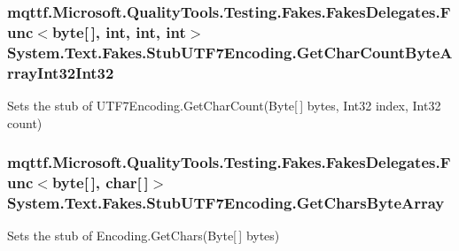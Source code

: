 \hypertarget{class_system_1_1_text_1_1_fakes_1_1_stub_u_t_f7_encoding_a3cb8eb1cb6572e14e0da37693b2c80de}{
\subsubsection[{Get\-Char\-Count\-Byte\-Array\-Int32\-Int32}]{\setlength{\rightskip}{0pt plus 5cm}mqttf.\-Microsoft.\-Quality\-Tools.\-Testing.\-Fakes.\-Fakes\-Delegates.\-Func$<$byte\mbox{[}$\,$\mbox{]}, int, int, int$>$ System.\-Text.\-Fakes.\-Stub\-U\-T\-F7\-Encoding.\-Get\-Char\-Count\-Byte\-Array\-Int32\-Int32}}\label{class_system_1_1_text_1_1_fakes_1_1_stub_u_t_f7_encoding_a3cb8eb1cb6572e14e0da37693b2c80de}


Sets the stub of U\-T\-F7\-Encoding.\-Get\-Char\-Count(\-Byte\mbox{[}$\,$\mbox{]} bytes, Int32 index, Int32 count)

\hypertarget{class_system_1_1_text_1_1_fakes_1_1_stub_u_t_f7_encoding_a45784701b113e5fe98aa9cae8f793c8e}{
\subsubsection[{Get\-Chars\-Byte\-Array}]{\setlength{\rightskip}{0pt plus 5cm}mqttf.\-Microsoft.\-Quality\-Tools.\-Testing.\-Fakes.\-Fakes\-Delegates.\-Func$<$byte\mbox{[}$\,$\mbox{]}, char\mbox{[}$\,$\mbox{]}$>$ System.\-Text.\-Fakes.\-Stub\-U\-T\-F7\-Encoding.\-Get\-Chars\-Byte\-Array}}\label{class_system_1_1_text_1_1_fakes_1_1_stub_u_t_f7_encoding_a45784701b113e5fe98aa9cae8f793c8e}


Sets the stub of Encoding.\-Get\-Chars(\-Byte\mbox{[}$\,$\mbox{]} bytes)

